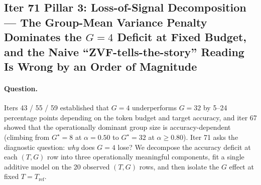 \subsection{Iter 71 Pillar 3: Loss-of-Signal Decomposition ---
              The Group-Mean Variance Penalty Dominates the $G{=}4$ Deficit
              at Fixed Budget, and the Naive ``ZVF-tells-the-story''
              Reading Is Wrong by an Order of Magnitude}
\label{sec:group-size-iter71}

\paragraph{Question.}
Iters 43 / 55 / 59 established that $G{=}4$ underperforms $G{=}32$
by 5--24 percentage points depending on the token budget and target
accuracy, and iter 67 showed that the operationally dominant group
size is accuracy-dependent (climbing from $G^\star{=}8$ at
$\alpha{=}0.50$ to $G^\star{=}32$ at $\alpha{\ge}0.80$).  Iter 71
asks the diagnostic question: \emph{why} does $G{=}4$ lose?  We
decompose the accuracy deficit at each $(T, G)$ row into three
operationally meaningful components, fit a single additive model on
the 20 observed $(T, G)$ rows, and then isolate the $G$ effect at
fixed $T{=}T_{\mathrm{ref}}$.

